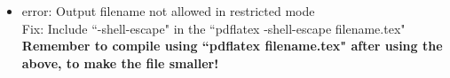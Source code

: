 \usepackage{setspace}
\doublespacing
\usepackage[margin=0.5in]{geometry}
\usepackage{rotating} %
\usepackage[toc,page]{appendix}
\usepackage{cancel,comment,alltt}
\usepackage{mathtools,amsmath,amsthm,bm,amsfonts}

\usepackage{url,hyperref,breakurl}

\usepackage{float,subfig,color,array,multirow,tikz}

\usepackage{multirow}

\usepackage {pdfsync}




\begin{itemize}

\item error: Output filename not allowed in restricted mode \\
Fix: Include ``-shell-escape" in the ``pdflatex -shell-escape filename.tex" \\
{\bf Remember to compile using ``pdflatex filename.tex" after using the above, to make the file smaller!} \\




\end{itemize}













